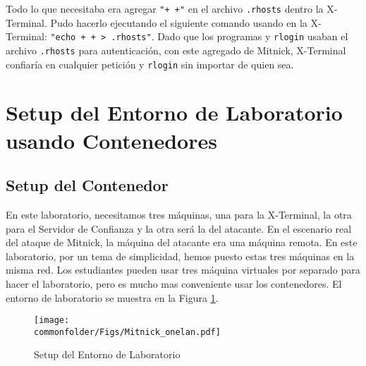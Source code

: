 Todo lo que necesitaba era agregar \texttt{"+ +"} en el archivo \texttt{.rhosts} dentro la X-Terminal.
Pudo hacerlo ejecutando el siguiente comando usando \rsh en la X-Terminal:  {\tt "echo + + > .rhosts"}. 
Dado que los programas \rsh y \texttt{rlogin} usaban el archivo \texttt{.rhosts} para autenticación, con este agregado de Mitnick, X-Terminal confiaría en cualquier petición \rsh y \texttt{rlogin} sin importar de quien sea.


\section{Setup del Entorno de Laboratorio usando Contenedores}



\subsection{Setup del Contenedor}

En este laboratorio, necesitamos tres máquinas, una para la X-Terminal, la otra para el Servidor de Confianza y la otra será la del atacante.
En el escenario real del ataque de Mitnick, la máquina del atacante era una máquina remota.
En este laboratorio, por un tema de simplicidad, hemos puesto estas tres máquinas en la misma red.
Los estudiantes pueden usar tres máquina virtuales por separado para hacer el laboratorio, pero es mucho mas conveniente usar los contenedores. 
El entorno de laboratorio se muestra en la Figura \ref{mitnick:fig:labsetup}.


\begin{figure}[htb]
\begin{center}
\texttt{[image: \\commonfolder/Figs/Mitnick\_onelan.pdf]}
\end{center}
\caption{Setup del Entorno de Laboratorio}
\label{mitnick:fig:labsetup}
\end{figure}
 

%



